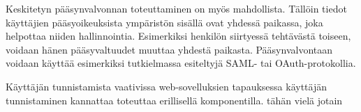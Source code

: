 Keskitetyn pääsynvalvonnan toteuttaminen on myös mahdollista. Tällöin tiedot käyttäjien pääsyoikeuksista ympäristön sisällä ovat yhdessä paikassa, joka helpottaa niiden hallinnointia. Esimerkiksi henkilön siirtyessä tehtävästä toiseen, voidaan hänen pääsyvaltuudet muuttaa yhdestä paikasta. Pääsynvalvontaan voidaan käyttää esimerkiksi tutkielmassa esiteltyjä SAML- tai OAuth-protokollia.

Käyttäjän tunnistamista vaativissa web-sovelluksien tapauksessa käyttäjän tunnistaminen kannattaa toteuttaa erillisellä komponentilla. tähän vielä jotain